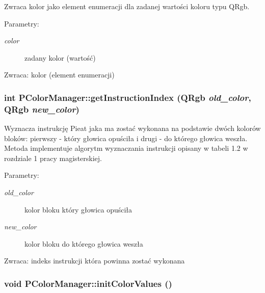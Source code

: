 Zwraca kolor jako element enumeracji dla zadanej wartości koloru typu QRgb. \begin{Desc}
\item[Parametry:]
\begin{description}
\item[{\em color}]zadany kolor (wartość) \end{description}
\end{Desc}
\begin{Desc}
\item[Zwraca:]kolor (element enumeracji) \end{Desc}
\hypertarget{classPColorManager_36a84d6e85c87edf65fdb511690ed434}{
\subsubsection[{getInstructionIndex}]{\setlength{\rightskip}{0pt plus 5cm}int PColorManager::getInstructionIndex (QRgb {\em old\_\-color}, \/  QRgb {\em new\_\-color})}}
\label{classPColorManager_36a84d6e85c87edf65fdb511690ed434}


Wyznacza instrukcję Pieat jaka ma zostać wykonana na podstawie dwóch kolorów bloków: pierwszy - który głowica opuściła i drugi - do którego głowica weszła. Metoda implementuje algorytm wyznaczania instrukcji opisany w tabeli 1.2 w rozdziale 1 pracy magisterskiej. \begin{Desc}
\item[Parametry:]
\begin{description}
\item[{\em old\_\-color}]kolor bloku który głowica opuściła \item[{\em new\_\-color}]kolor bloku do którego głowica weszła \end{description}
\end{Desc}
\begin{Desc}
\item[Zwraca:]indeks instrukcji która powinna zostać wykonana \end{Desc}
\hypertarget{classPColorManager_e9793e8da1800653b11609376098695c}{
\subsubsection[{initColorValues}]{\setlength{\rightskip}{0pt plus 5cm}void PColorManager::initColorValues ()}}
\label{classPColorManager_e9793e8da1800653b11609376098695c}


